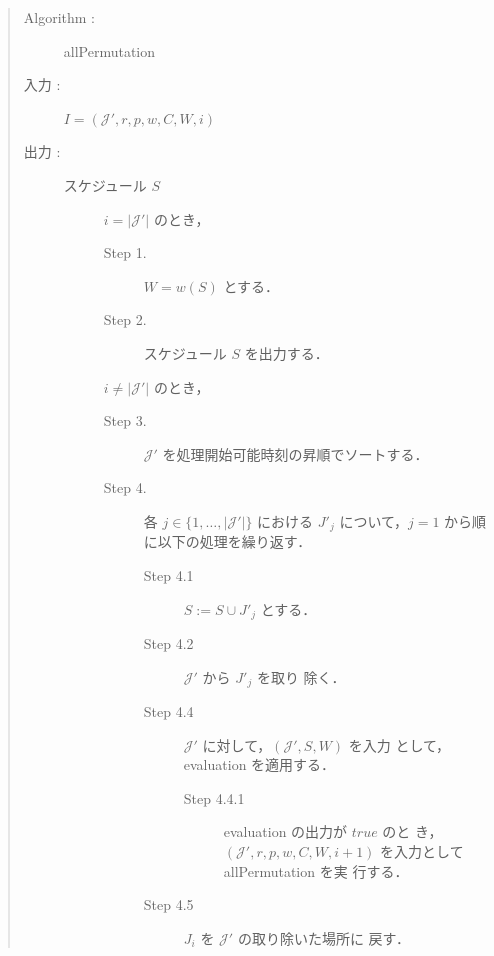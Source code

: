 \documentclass[12pt]{optlab-bachelor}
\begin{document}
\begin{quote}
  \begin{description}
    \item[{\sc Algorithm : }] {\sc allPermutation}
    \item[入力 :] $I = (\mathcal{J}',r,p,w,C,W,i)$
    \item[出力 :] スケジュール $S$
    \begin{description}
      \item[] $i = |\mathcal{J}'|$ のとき，
      \begin{description}
        \item[Step 1.] $W = w(S)$ とする．
        \item[Step 2.] スケジュール $S$ を出力する．
      \end{description}
      \item[] $i \neq |\mathcal{J}'|$ のとき，
      \begin{description}
        \item[Step 3.] $\mathcal{J}'$ を処理開始可能時刻の昇順でソートする．
        \item[Step 4.] 各 $j \in \{1,\ldots,|\mathcal{J}'|\}$ における $J'_j$ について，$j = 1$ から順に以下の処理を繰り返す．
        \begin{description}
          \item[Step 4.1] $S := S \cup J'_j$ とする．
          \item[Step 4.2] $\mathcal{J}'$ から $J'_j$ を取り
          除く．
          \item[Step 4.4] $\mathcal{J}'$ に対して，$(\mathcal{J}',S, W)$ を入力
          として，{\sc evaluation} を適用する．
          \begin{description}
            \item[Step 4.4.1] {\sc evaluation} の出力が $true$ のと
            き，\\$(\mathcal{J}',r,p,w,C,W,i + 1)$ を入力として\\{\sc allPermutation} を実
            行する．
          \end{description}
          \item[Step 4.5] $J_i$ を $\mathcal{J}'$ の取り除いた場所に
          戻す．
        \end{description}
      \end{description}
    \end{description}
  \end{description}
\end{quote}
\end{document}
